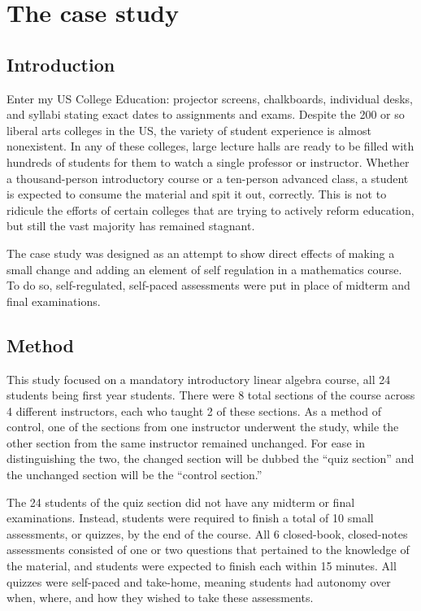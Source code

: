 \chapter{The case study}
\section{Introduction}

Enter my US College Education: projector screens, chalkboards, individual desks, and syllabi stating exact dates to assignments and exams. Despite the 200 or so liberal arts colleges in the US, the variety of student experience is almost nonexistent. In any of these colleges, large lecture halls are ready to be filled with hundreds of students for them to watch a single professor or instructor. Whether a thousand-person introductory course or a ten-person advanced class, a student is expected to consume the material and spit it out, correctly. This is not to ridicule the efforts of certain colleges that are trying to actively reform education, but still the vast majority has remained stagnant.

The case study was designed as an attempt to show direct effects of making a small change and adding an element of self regulation in a mathematics course. To do so, self-regulated, self-paced assessments were put in place of midterm and final examinations.

\section{Method}

This study focused on a mandatory introductory linear algebra course, all 24 students being first year students. There were 8 total sections of the course across 4 different instructors, each who taught 2 of these sections. As a method of control, one of the sections from one instructor underwent the study, while the other section from the same instructor remained unchanged. For ease in distinguishing the two, the changed section will be dubbed the ``quiz section'' and the unchanged section will be the ``control section.''

The 24 students of the quiz section did not have any midterm or final examinations. Instead, students were required to finish a total of 10 small assessments, or quizzes, by the end of the course. All 6 closed-book, closed-notes assessments consisted of one or two questions that pertained to the knowledge of the material, and students were expected to finish each within 15 minutes. All quizzes were self-paced and take-home, meaning students had autonomy over when, where, and how they wished to take these assessments.

